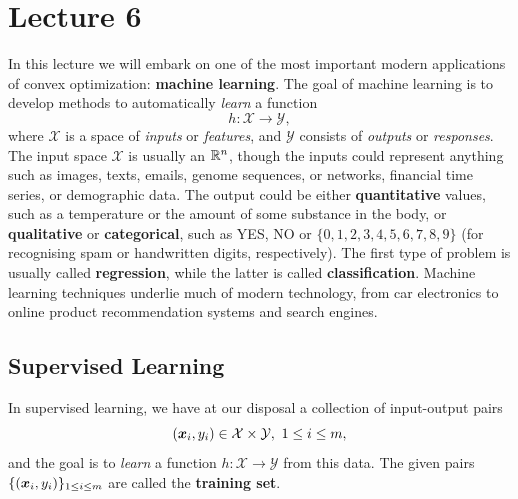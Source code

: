 %
%
% 


\chapter*{Lecture 6}
\addtocounter{chapter}{6}
\addtocounter{section}{0}

In this lecture we will embark on one of the most important modern applications of convex optimization: \textbf{machine learning}. The goal of machine learning is to develop methods to automatically {\em learn} a function
\begin{equation*}
 h\colon \mathcal{X}\to \mathcal{Y},
\end{equation*}
where $\mathcal{X}$ is a space of {\em inputs} or {\em features}, and $\mathcal{Y}$ consists of {\em outputs} or {\em responses}. The input space $\mathcal{X}$ is usually an $\mathbb{R}^n$, though the inputs could represent anything such as images, texts, emails, genome sequences, or networks, financial time series, or demographic data. The output could be either \textbf{quantitative} values, such as a temperature or the amount of some substance in the body, or \textbf{qualitative} or \textbf{categorical}, such as {YES, NO} or $\{0,1,2,3,4,5,6,7,8,9\}$ (for recognising spam or handwritten digits, respectively). The first type of problem is usually called \textbf{regression}, while the latter is called \textbf{classification}. Machine learning techniques underlie much of modern technology, from car electronics to online product recommendation systems and search engines.

\section{Supervised Learning}
In supervised learning, we have at our disposal a collection of input-output pairs
\begin{equation*}
  (\bm{x}_i, y_i) \in \mathcal{X}\times \mathcal{Y}, \ 1\leq i\leq m,
\end{equation*}
and the goal is to {\em learn} a function $h\colon \mathcal{X}\to \mathcal{Y}$ from this data. 
The given pairs $\{(\bm{x}_i,y_i)\}_{1\leq i\leq m}$ are called the \textbf{training set}.

